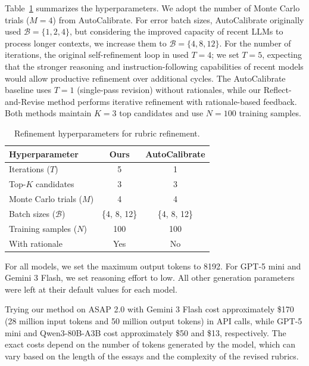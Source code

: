 \documentclass[11pt]{article}
\begin{document}
Table~\ref{tab:hyperparams} summarizes the hyperparameters. We adopt the number of Monte Carlo trials ($M{=}4$) from AutoCalibrate. For error batch sizes, AutoCalibrate originally used $\mathcal{B}{=}\{1,2,4\}$, but considering the improved capacity of recent LLMs to process longer contexts, we increase them to $\mathcal{B}{=}\{4,8,12\}$. For the number of iterations, the original self-refinement loop in \citet{madaan2023selfrefine} used $T{=}4$; we set $T{=}5$, expecting that the stronger reasoning and instruction-following capabilities of recent models would allow productive refinement over additional cycles. The AutoCalibrate baseline uses $T{=}1$ (single-pass revision) without rationales, while our Reflect-and-Revise method performs iterative refinement with rationale-based feedback. Both methods maintain $K{=}3$ top candidates and use $N{=}100$ training samples.

\begin{table}[h]
  \centering
  \small
  \begin{tabular}{lcc}
    \toprule
    \textbf{Hyperparameter} & \textbf{Ours} & \textbf{AutoCalibrate} \\
    \midrule
    Iterations ($T$) & 5 & 1 \\
    Top-$K$ candidates & 3 & 3 \\
    Monte Carlo trials ($M$) & 4 & 4 \\
    Batch sizes ($\mathcal{B}$) & \{4, 8, 12\} & \{4, 8, 12\} \\
    Training samples ($N$) & 100 & 100 \\
    With rationale & Yes & No \\
    \bottomrule
  \end{tabular}
  \caption{Refinement hyperparameters for rubric refinement.}
  \label{tab:hyperparams}
\end{table}

For all models, we set the maximum output tokens to 8192. For GPT-5 mini and Gemini 3 Flash, we set reasoning effort to low. All other generation parameters were left at their default values for each model.

Trying our method on ASAP 2.0 with Gemini 3 Flash cost approximately \$170 (28 million input tokens and 50 million output tokens) in API calls, while GPT-5 mini and Qwen3-80B-A3B cost approximately \$50 and \$13, respectively. The exact costs depend on the number of tokens generated by the model, which can vary based on the length of the essays and the complexity of the revised rubrics.
\end{document}
